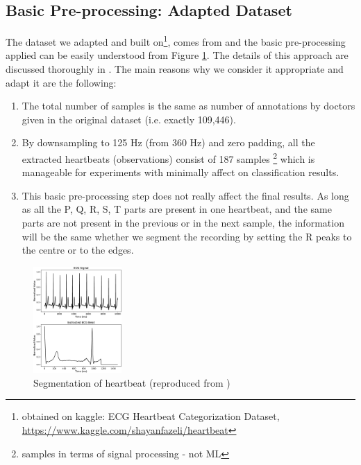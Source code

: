 \documentclass[a4paper,10pt,twocolumn]{article}
\begin{document}
\subsection{Basic Pre-processing: Adapted Dataset}
The dataset we adapted and built on\footnote{obtained on kaggle: ECG Heartbeat Categorization Dataset, \url{https://www.kaggle.com/shayanfazeli/heartbeat}}, comes from \cite{kachuee2018ecg} and the basic pre-processing applied can be easily understood from Figure \ref{fig:adapted}. The details of this approach are discussed thoroughly in \cite{kachuee2018ecg}. The main reasons why we consider it appropriate and adapt it are the following:
\begin{enumerate}
  \item The total number of samples is the same as number of annotations by doctors given in the original dataset (i.e. exactly 109,446).
  \item By downsampling to 125 Hz (from 360 Hz) and zero padding, all the extracted heartbeats (observations) consist of 187 samples \footnote{samples in terms of signal processing - not ML} which is manageable for experiments with minimally affect on classification results.
  \item This basic pre-processing step does not really affect the final results. As long as all the P, Q, R, S, T parts are present in one heartbeat, and the same parts are not present in the previous or in the next sample, the information will be the same whether we segment the recording by setting the R peaks to the centre or to the edges.
\end{enumerate}

\begin{figure}[ht]
     \centering
     \includegraphics[width=0.3\textwidth]{images/adapted.png}
      \caption{Segmentation of heartbeat (reproduced from \cite{kachuee2018ecg})}
      \label{fig:adapted}
\end{figure}
\end{document}
